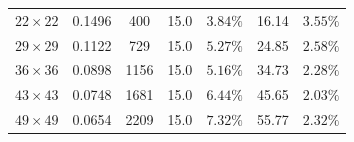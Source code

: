 \documentclass[VANCOUVER,Times1COL]{WileyNJD-v5}
\begin{document}
\begin{table}[!t]
{\begin{tabular}{ccccccc}
            $22 \times 22$            & 0.1496                                       & 400             & 15.0                                                                   & $3.84\%$                                                                                      & 16.14                              & $\mathbf{3.55\%}$                                    \\
            $29 \times 29$            & 0.1122                                       & 729             & 15.0                                                                   & $5.27\%$                                                                                      & 24.85                              & $\mathbf{2.58\%}$                                    \\
            $36 \times 36$            & 0.0898                                       & 1156            & 15.0                                                                   & $5.16\%$                                                                                      & 34.73                              & $\mathbf{2.28\%}$                                    \\
            $43 \times 43$            & 0.0748                                       & 1681            & 15.0                                                                   & $6.44\%$                                                                                      & 45.65                              & $\mathbf{2.03\%}$                                    \\
            $49 \times 49$            & 0.0654                                       & 2209            & 15.0                                                                   & $7.32\%$                                                                                      & 55.77                              & $\mathbf{2.32\%}$                                    \\
            \bottomrule
        \end{tabular}
    }
\end{table}
\end{document}
